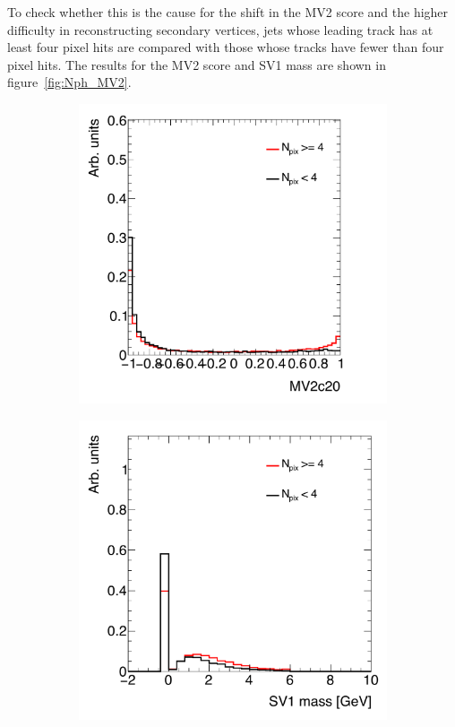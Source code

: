 To check whether this is the cause for the shift in the MV2 score and the higher difficulty in reconstructing secondary vertices, jets whose leading track has at least four pixel hits are compared with those whose tracks have fewer than four pixel hits. The results for the MV2 score and SV1 mass are shown in figure~\ref{fig:Nph_MV2}. 
%
\begin{figure}[h!]
  \centering
  \captionsetup{justification=centering}

   \begin{subfigure}[t]{0.5\textwidth}
        \centering
        \includegraphics[width=\textwidth]{figures/Nph_MV2c20}
        \caption{}
    \end{subfigure}%
    \begin{subfigure}[t]{0.5\textwidth}
        \centering
        \includegraphics[width=\textwidth]{figures/Nph_SV1mass}

\end{subfigure}
\end{figure}
